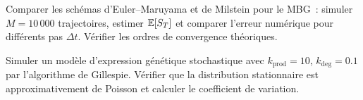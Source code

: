 \begin{exercice}
Comparer les sch\'emas d'Euler--Maruyama et de Milstein pour le MBG~:
simuler $M = 10\,000$ trajectoires, estimer $\mathbb{E}[S_T]$ et comparer
l'erreur num\'erique pour diff\'erents pas $\Delta t$. V\'erifier les
ordres de convergence th\'eoriques.
\end{exercice}

\begin{exercice}
Simuler un mod\`ele d'expression g\'en\'etique stochastique avec
$k_{\text{prod}} = 10$, $k_{\text{deg}} = 0.1$ par l'algorithme de
Gillespie. V\'erifier que la distribution stationnaire est approximativement
de Poisson et calculer le coefficient de variation.
\end{exercice}
